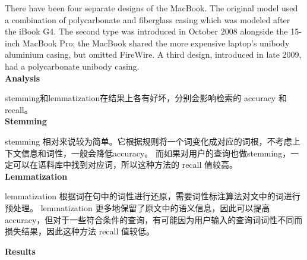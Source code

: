 \begin{homeworkProblem}
    There have been four separate designs of the MacBook. The original model used a combination of polycarbonate and fiberglass casing which was modeled after the iBook G4. The second type was introduced in October 2008 alongside the 15-inch MacBook Pro; the MacBook shared the more expensive laptop's unibody aluminium casing, but omitted FireWire. A third design, introduced in late 2009, had a polycarbonate unibody casing.
    \\

    \textbf{\large Analysis}

    stemming和lemmatization在结果上各有好坏，分别会影响检索的 accuracy 和 recall。
    \\

    \textbf{Stemming}

    stemming 相对来说较为简单。它根据规则将一个词变化成对应的词根，不考虑上下文信息和词性，一般会降低accuracy。
    而如果对用户的查询也做stemming，一定可以在语料库中找到对应词，所以这种方法的 recall 值较高。
    \\

    \textbf{Lemmatization}

    lemmatization 根据词在句中的词性进行还原，需要词性标注算法对文中的词进行预处理。
    lemmatization 更多地保留了原文中的语义信息，因此可以提高 accuracy，但对于一些符合条件的查询，有可能因为用户输入的查询词词性不同而损失结果，因此这种方法 recall 值较低。
    \\

    \pagebreak

    \textbf{\large Results}


\end{homeworkProblem}
